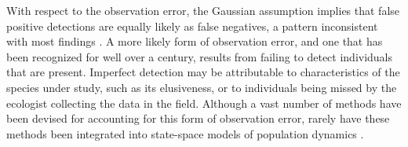 \documentclass[12pt,english]{article}
\begin{document}
\begin{spacing}{1.9}
\begin{flushleft}
With respect to the observation error, the Gaussian assumption
implies that false positive detections are
equally likely as false negatives, a pattern inconsistent with most
findings \citep{miller_etal:2011}. 
A more likely form of observation error, and one that has been recognized for well
over a century, results from failing to detect individuals that are
present. Imperfect detection may be attributable to
characteristics of the species under study, such as its elusiveness,
or to individuals being missed by the ecologist collecting the data in the field.
Although a vast number of methods have been devised for accounting for
this form of observation error, rarely have these methods been
integrated into state-space models of population dynamics \citep[but
see][]{buckland_etal:2004}.


\end{flushleft}
\end{spacing}
\end{document}

